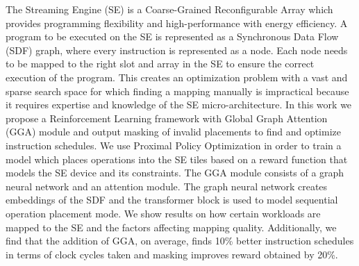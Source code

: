 The Streaming Engine (SE) is a Coarse-Grained Reconfigurable Array which provides programming flexibility and high-performance with energy efficiency.
A program to be executed on the SE is represented as a Synchronous Data Flow (SDF) graph, where every instruction is represented as a node.
Each node needs to be mapped to the right slot and array in the SE to ensure the correct execution of the program.
This creates an optimization problem with a vast and sparse search space for which finding a mapping manually is impractical because it requires expertise and knowledge of the SE micro-architecture.
In this work we propose a Reinforcement Learning framework with Global Graph Attention (GGA) module and output masking of invalid placements to find and optimize instruction schedules.
We use Proximal Policy Optimization in order to train a model which places operations into the SE tiles based on a reward function that models the SE device and its constraints.
The GGA module consists of a graph neural network and an attention module. 
The graph neural network creates embeddings of the SDF and the transformer block is used to model sequential operation placement mode. 
We show results on how certain workloads are mapped to the SE and the factors affecting mapping quality.
Additionally, we find that the addition of GGA, on average, finds 10\% better instruction schedules in terms of clock cycles taken and masking improves reward obtained by 20\%.
